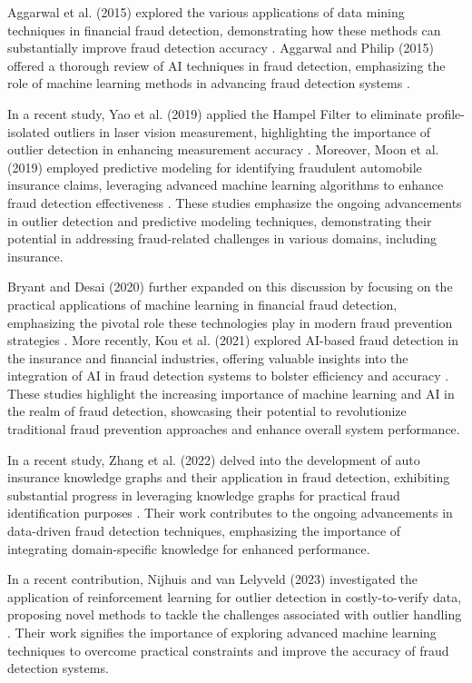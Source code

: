 \documentclass[12pt]{article}
\begin{document}
Aggarwal et al. (2015) explored the various applications of data
mining techniques in financial fraud detection, demonstrating how
these methods can substantially improve fraud detection accuracy
\cite{A70}. Aggarwal and Philip (2015) offered a thorough review
of AI techniques in fraud detection, emphasizing the role of
machine learning methods in advancing fraud detection systems
\cite{A74}.

In a recent study, Yao et al. (2019) applied the Hampel Filter to
eliminate profile-isolated outliers in laser vision measurement,
highlighting the importance of outlier detection in enhancing
measurement accuracy \cite{A80}. Moreover, Moon et al. (2019)
employed predictive modeling for identifying fraudulent automobile
insurance claims, leveraging advanced machine learning algorithms
to enhance fraud detection effectiveness \cite{A80}. These studies
emphasize the ongoing advancements in outlier detection and
predictive modeling techniques, demonstrating their potential in
addressing fraud-related challenges in various domains, including
insurance.


Bryant and Desai (2020) further expanded on this discussion by
focusing on the practical applications of machine learning in
financial fraud detection, emphasizing the pivotal role these
technologies play in modern fraud prevention strategies
\cite{A75}. More recently, Kou et al. (2021) explored AI-based
fraud detection in the insurance and financial industries,
offering valuable insights into the integration of AI in fraud
detection systems to bolster efficiency and accuracy \cite{A78}.
These studies highlight the increasing importance of machine
learning and AI in the realm of fraud detection, showcasing their
potential to revolutionize traditional fraud prevention approaches
and enhance overall system performance.


In a recent study, Zhang et al. (2022) delved into the development
of auto insurance knowledge graphs and their application in fraud
detection, exhibiting substantial progress in leveraging knowledge
graphs for practical fraud identification purposes \cite{A27}.
Their work contributes to the ongoing advancements in data-driven
fraud detection techniques, emphasizing the importance of
integrating domain-specific knowledge for enhanced performance.


In a recent contribution, Nijhuis and van Lelyveld (2023)
investigated the application of reinforcement learning for outlier
detection in costly-to-verify data, proposing novel methods to
tackle the challenges associated with outlier handling \cite{A73}.
Their work signifies the importance of exploring advanced machine
learning techniques to overcome practical constraints and improve
the accuracy of fraud detection systems.
\end{document}
